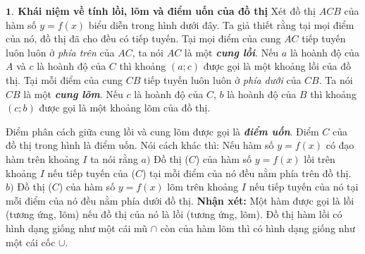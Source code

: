 \begin{multicols}{2}
	\textbf{\color{hoccungpi}$\pmb{1.}$ Khái niệm về tính lồi, lõm và điểm uốn của đồ thị}
	\vskip 0.1cm
	Xét đồ thị $ACB$ của hàm số $y = f(x)$ biểu diễn trong hình dưới đây. Ta giả thiết rằng tại mọi điểm của nó, đồ thị đã cho đều có tiếp tuyến. Tại mọi điểm của cung $AC$ tiếp tuyến luôn luôn ở \emph{phía trên} của $AC$, ta nói $AC$ là một \textbf{\color{hoccungpi}\itshape cung lồi}. Nếu $a$ là hoành độ của $A$ và $c$ là hoành độ của $C$ thì khoảng $(a; c)$ được gọi là một khoảng lồi của đồ thị. Tại mỗi điểm của cung $CB$ tiếp tuyến luôn luôn ở \emph{\itshape phía dưới} của $CB$. Ta nói $CB$ là một \textbf{\color{hoccungpi}\itshape cung lõm}. Nếu $c$ là hoành độ của $C$, $b$ là hoành độ của $B$ thì khoảng $(c; b)$ được gọi là một khoảng lõm của đồ thị.
	\begin{center}
	\end{center}
	Điểm phân cách giữa cung lồi và cung lõm được gọi là \textbf{\color{hoccungpi}\itshape điểm uốn}. Điểm $C$ của đồ thị trong hình là điểm uốn.
	\vskip 0.1cm
	Nói cách khác thì: 
	Nếu hàm số $y=f(x)$ có đạo hàm trên khoảng $I$ ta nói rằng
	\vskip 0.1cm
	$a)$ Đồ thị ($C$) của hàm số $y = f(x)$ lồi trên khoảng $I$ nếu tiếp tuyến của ($C$) tại mỗi điểm của nó đều nằm phía trên đồ thị.
	\vskip 0.1cm
	$b)$ Đồ thị ($C$) của hàm số $ y = f(x)$ lõm trên khoảng $I$ nếu tiếp tuyến của nó tại mỗi điểm của nó đều nằm phía dưới đồ thị.
	\vskip 0.1cm
	\textbf{\color{hoccungpi}Nhận xét:} Một hàm được gọi là lồi (tương ứng, lõm) nếu đồ thị của nó là lồi (tương ứng, lõm). Đồ thị hàm lồi có hình dạng giống như một cái mũ $\cap $ còn của hàm lõm thì có hình dạng giống như một cái cốc  $\cup $.

\end{multicols}
